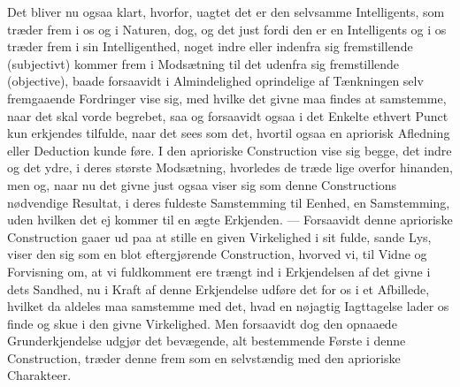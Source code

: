 \documentclass[12pt,a4paper]{book}
\newcommand{\apage}[1]{\marginnote{\footnotesize\textit{[#1]}}}
\begin{document}
Det bliver nu ogsaa klart, hvorfor, uagtet det er den selvsamme Intelligents, som
træder frem i os og i Naturen, dog, og det just fordi den er en Intelligents og i
os træder frem i sin Intelligenthed, noget indre eller indenfra sig fremstillende
(subjectivt) kommer frem i Modsætning til det udenfra sig fremstillende
(objective), baade forsaavidt i Almindelighed oprindelige af Tænkningen selv
fremgaaende Fordringer vise sig, med hvilke det givne maa findes at samstemme, \apage{68} 
naar det skal vorde begrebet, saa og forsaavidt ogsaa i det Enkelte ethvert Punct
kun erkjendes tilfulde, naar det sees som det, hvortil ogsaa en apriorisk
Afledning eller Deduction kunde føre. I den aprioriske Construction vise sig
begge, det indre og det ydre, i deres største Modsætning, hvorledes de træde lige
overfor hinanden, men og, naar nu det givne just ogsaa viser sig som denne
Constructions nødvendige Resultat, i deres fuldeste Samstemming til Eenhed, en
Samstemming, uden hvilken det ej kommer til en ægte Erkjenden. --- Forsaavidt
denne aprioriske Construction gaaer ud paa at stille en given Virkelighed i sit
fulde, sande Lys, viser den sig som en blot eftergjørende Construction, hvorved
vi, til Vidne og Forvisning om, at vi fuldkomment ere trængt ind i Erkjendelsen
af det givne i dets Sandhed, nu i Kraft af denne Erkjendelse udføre det for os i
et Afbillede, hvilket da aldeles maa samstemme med det, hvad en nøjagtig
Iagttagelse lader os finde og skue i den givne Virkelighed. Men forsaavidt dog
den opnaaede Grunderkjendelse udgjør det bevægende, alt bestemmende Første i denne
Construction, træder denne frem som en selvstændig med den aprioriske Charakteer.
\end{document}
